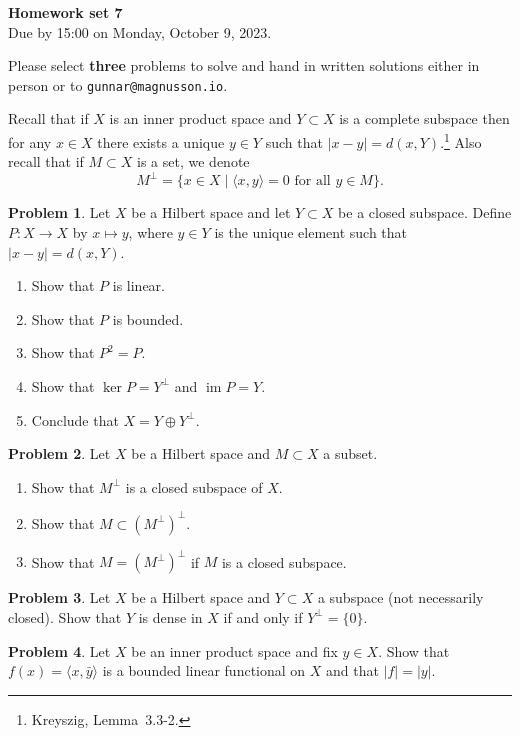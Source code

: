 \documentclass[11pt]{article}
\theoremstyle{definition}
\newtheorem{prob}{Problem}
\def\<{\langle}
\def\>{\rangle}
\DeclareMathOperator{\im}{im}
\def\head{
\begin{center}
\textbf{\LARGE Homework set 7}
\\[3pt]
Due by 15:00 on Monday, October 9, 2023.
\end{center}
\medskip
}
\begin{document}
\head

Please select \textbf{three} problems to solve and hand in written solutions
either in person or to \verb+gunnar@magnusson.io+.

Recall that if $X$ is an inner product space and $Y \subset X$ is a complete
subspace then for any $x \in X$ there exists a unique $y \in Y$ such that $|x -
y| = d(x, Y)$.\footnote{Kreyszig, Lemma~3.3-2.}
Also recall that if $M \subset X$ is a set, we denote
\[
M^\perp = \{ x \in X \mid \text{$\<x, y\> = 0$ for all $y \in M$}\}.
\]

\begin{prob}
Let $X$ be a Hilbert space and let $Y \subset X$ be a closed subspace.
Define $P : X \to X$ by $x \mapsto y$, where $y \in Y$ is the unique element
such that $|x - y| = d(x, Y)$.
\begin{enumerate}
\item
Show that $P$ is linear.

\item
Show that $P$ is bounded.

\item
Show that $P^2 = P$.

\item
Show that $\ker P = Y^\perp$ and $\im P = Y$.

\item
Conclude that $X = Y \oplus Y^\perp$.
\end{enumerate}
\end{prob}

\begin{prob}
Let $X$ be a Hilbert space and $M \subset X$ a subset.
\begin{enumerate}
\item
Show that $M^\perp$ is a closed subspace of $X$.

\item
Show that $M \subset (M^\perp)^\perp$.

\item
Show that $M = (M^\perp)^\perp$ if $M$ is a closed subspace.
\end{enumerate}
\end{prob}

\begin{prob}
Let $X$ be a Hilbert space and $Y \subset X$ a subspace (not necessarily closed).
Show that $Y$ is dense in $X$ if and only if $Y^\perp = \{ 0 \}$.
\end{prob}

\begin{prob}
Let $X$ be an inner product space and fix $y \in X$.
Show that $f(x) = \<x, \bar y \>$ is a bounded linear functional on $X$
and that $|f| = |y|$.
\end{prob}
\end{document}
